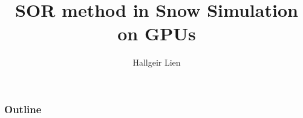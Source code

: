 \usepackage{style}
\usepackage{url}

\title[SOR in Snow Simulation]{SOR method in Snow Simulation on GPUs}
\author{Hallgeir Lien}


\maketitle

\AtBeginSection{
    \begin{frame}
    \tableofcontents[currentsection]
    \end{frame}
}

\begin{frame}
\frametitle{Outline}
\tableofcontents
\end{frame}






